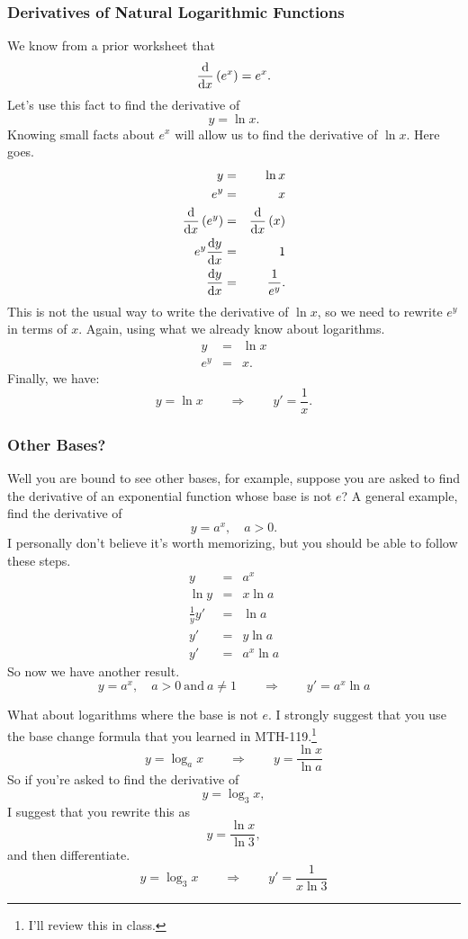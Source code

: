 \documentclass[12pt,addpoints, answers, fleqn]{exam}
\begin{document}
\subsubsection{Derivatives of Natural Logarithmic Functions}

We know from a prior worksheet that
\[
\frac{{\rm{d}}}{{\rm{d}}x} \left( e^x \right) = e^x.
\]
Let's use this fact to find the derivative of
\[
y = \ln x.
\]
Knowing small facts about $e^x$ will allow us to find the derivative of $\ln x$. Here goes.
\begin{eqnarray*}
y &=& \ln x\\
e^y &=& x\\
\frac{{\rm{d}}}{{\rm{d}}x} \left( e^y \right) &=& \frac{{\rm{d}}}{{\rm{d}}x} \left(  x \right)\\
e^y \frac{{\rm{d}}y}{{\rm{d}}x} &=& 1\\
\frac{{\rm{d}}y}{{\rm{d}}x} &=& \frac{1}{e^y}.
\end{eqnarray*}
This is not the usual way to write the derivative of $\ln x$, so we need to rewrite $e^y$ in terms of $x$. Again, using what we already know about logarithms.
\begin{eqnarray*}
y &=& \ln x\\
e^y &=& x.
\end{eqnarray*}
Finally, we have:
\[
y = \ln x \qquad \Rightarrow \qquad y' = \frac{1}{x}.
\]
\subsubsection{Other Bases?}

Well you are bound to see other bases, for example, suppose you are asked to find the derivative of an exponential function whose base is not $e$? A general example, find the derivative of
\[
y = a^x, \quad a > 0.
\]
I personally don't believe it's worth memorizing, but you should be able to follow these steps.
\begin{eqnarray*}
y &=& a^x\\
\ln y &=& x \ln a\\
\frac{1}{y} y' &=& \ln a\\
y' &=& y \ln a\\
y' &=& a^x \ln a
\end{eqnarray*}
So now we have another result.
\[
y = a^x, \quad a > 0 \ \mbox{and} \ a \neq 1 \qquad \Rightarrow \qquad y' = a^x \ln a
\]



What about logarithms where the base is not $e$. I strongly suggest that you use the base change formula that you learned in MTH-119.\footnote{I'll review this in class.}
\[
y = \log_a x \qquad \Rightarrow \qquad y = \frac{\ln x}{\ln a}
\]
So if you're asked to find the derivative of
\[
y = \log_3 x,
\]
I suggest that you rewrite this as
\[
y = \frac{\ln x }{\ln 3},
\]
and then differentiate.
\[
y = \log_3 x \qquad \Rightarrow \qquad y' = \frac{1}{x\ln3}
\]
\end{document}
